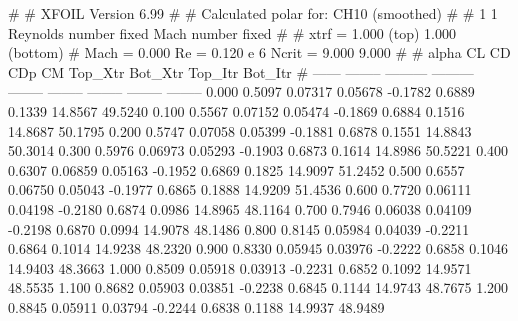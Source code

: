 #  
#       XFOIL         Version 6.99
#  
# Calculated polar for: CH10 (smoothed)                                 
#  
# 1 1 Reynolds number fixed          Mach number fixed         
#  
# xtrf =   1.000 (top)        1.000 (bottom)  
# Mach =   0.000     Re =     0.120 e 6     Ncrit =   9.000  9.000
#  
#   alpha    CL        CD       CDp       CM     Top_Xtr  Bot_Xtr  Top_Itr  Bot_Itr
#  ------ -------- --------- --------- -------- -------- -------- -------- --------
   0.000   0.5097   0.07317   0.05678  -0.1782   0.6889   0.1339  14.8567  49.5240
   0.100   0.5567   0.07152   0.05474  -0.1869   0.6884   0.1516  14.8687  50.1795
   0.200   0.5747   0.07058   0.05399  -0.1881   0.6878   0.1551  14.8843  50.3014
   0.300   0.5976   0.06973   0.05293  -0.1903   0.6873   0.1614  14.8986  50.5221
   0.400   0.6307   0.06859   0.05163  -0.1952   0.6869   0.1825  14.9097  51.2452
   0.500   0.6557   0.06750   0.05043  -0.1977   0.6865   0.1888  14.9209  51.4536
   0.600   0.7720   0.06111   0.04198  -0.2180   0.6874   0.0986  14.8965  48.1164
   0.700   0.7946   0.06038   0.04109  -0.2198   0.6870   0.0994  14.9078  48.1486
   0.800   0.8145   0.05984   0.04039  -0.2211   0.6864   0.1014  14.9238  48.2320
   0.900   0.8330   0.05945   0.03976  -0.2222   0.6858   0.1046  14.9403  48.3663
   1.000   0.8509   0.05918   0.03913  -0.2231   0.6852   0.1092  14.9571  48.5535
   1.100   0.8682   0.05903   0.03851  -0.2238   0.6845   0.1144  14.9743  48.7675
   1.200   0.8845   0.05911   0.03794  -0.2244   0.6838   0.1188  14.9937  48.9489
